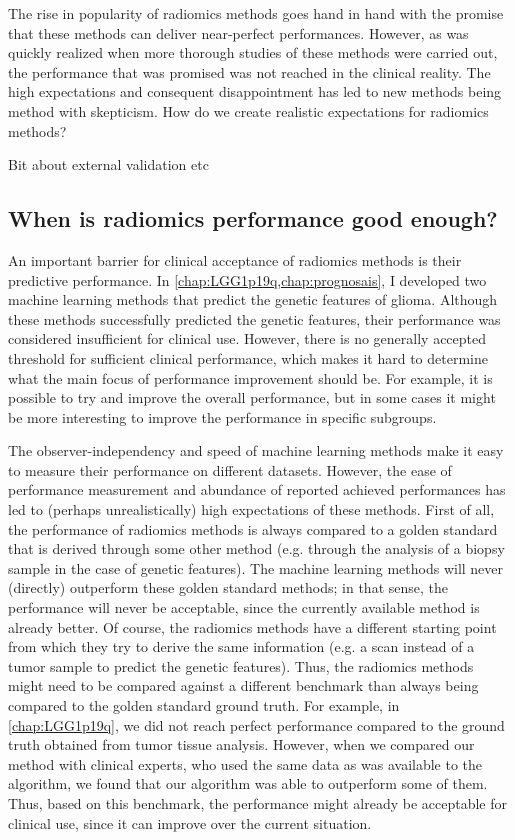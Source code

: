 The rise in popularity of radiomics methods goes hand in hand with the promise that these methods can deliver near-perfect performances.
However, as was quickly realized when more thorough studies of these methods were carried out, the performance that was promised was not reached in the clinical reality.
The high expectations and consequent disappointment has led to new methods being method with skepticism.
How do we create realistic expectations for radiomics methods?

Bit about external validation etc

\subsection{When is radiomics performance good enough?}

An important barrier for clinical acceptance of radiomics methods is their predictive performance.
In \cref{chap:LGG1p19q,chap:prognosais}, I developed two machine learning methods that predict the genetic features of glioma.
Although these methods successfully predicted the genetic features, their performance was considered insufficient for clinical use.
However, there is no generally accepted threshold for sufficient clinical performance, which makes it hard to determine what the main focus of performance improvement should be.
For example, it is possible to try and improve the overall performance, but in some cases it might be more interesting to improve the performance in specific subgroups.

The observer-independency and speed of machine learning methods make it easy to measure their performance on different datasets.
However, the ease of performance measurement and abundance of reported achieved performances has led to (perhaps unrealistically) high expectations of these methods.
First of all, the performance of radiomics methods is always compared to a golden standard that is derived through some other method (e.g. through the analysis of a biopsy sample in the case of genetic features).
The machine learning methods will never (directly) outperform these golden standard methods; in that sense, the performance will never be acceptable, since the currently available method is already better.
Of course, the radiomics methods have a different starting point from which they try to derive the same information (e.g. a scan instead of a tumor sample to predict the genetic features).
Thus, the radiomics methods might need to be compared against a different benchmark than always being compared to the golden standard ground truth.
For example, in \cref{chap:LGG1p19q}, we did not reach perfect performance compared to the ground truth obtained from tumor tissue analysis.
However, when we compared our method with clinical experts, who used the same data as was available to the algorithm, we found that our algorithm was able to outperform some of them.
Thus, based on this benchmark, the performance might already be acceptable for clinical use, since it can improve over the current situation.


